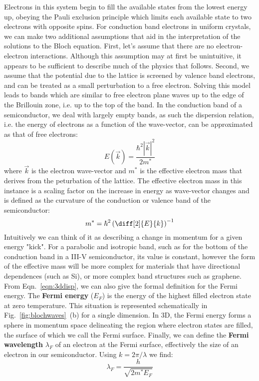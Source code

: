 Electrons in this system begin to fill the available states from the lowest energy up, obeying the Pauli exclusion principle which limits
each available state to two electrons with opposite spins. For conduction band electrons in uniform crystals, we can make
two additional assumptions that aid in the interpretation of the solutions to the Bloch equation. First, let's assume that
there are no electron-electron interactions. Although this assumption may at first be unintuitive, it appears
to be sufficient to describe much of the physics that follows. Second, we assume that the potential due to the
lattice is screened by valence band electrons, and can be treated as a small perturbation to a free electron. Solving
this model leads to bands which are similar to free electron plane waves up to the edge of the Brillouin zone, i.e.
up to the top of the band. In the conduction band of a semiconductor, we deal with largely empty bands, as such
the dispersion relation, i.e. the energy of electrons as a function of the wave-vector, can be approximated as that of free electrons:
\begin{equation}
  E(\vec{k}) = \frac{\hbar^2 |\vec{k}|^2}{2m^*}
  \label{eqn:3ddisp}
\end{equation}
where $\vec{k}$ is the electron wave-vector and $m^*$ is the effective electron mass that derives from the peturbation of the lattice.
The effective electron mass in this instance is a scaling factor on the increase in energy as wave-vector changes and is
defined as the curvature of the conduction or valence band of the semiconductor:
\begin{equation}
  m^* = \hbar^2 \left(\diff[2]{E}{k}\right)^{-1}
\end{equation}
Intuitively we can think of it as describing a change in momentum for a given energy "kick". For a parabolic and isotropic
band, such as for the bottom of the conduction band in a III-V semiconductor, its value is constant, however
the form of the effective mass will be more complex for materials that have directional dependences (such as Si),
or more complex band structures such as graphene. From Eqn.~\ref{eqn:3ddisp}, we can also give the
formal definition for the Fermi energy. The \textbf{Fermi energy} ($E_F$) is the energy of the highest filled electron state
at zero temperature. This situation is represented schematically in Fig.~\ref{fig:blochwaves}~(b) for a single dimension.
In 3D, the Fermi energy forms a sphere in momentum space delineating the region where electron states are filled, the surface
of which we call the Fermi surface. Finally, we can define the \textbf{Fermi wavelength} $\lambda_F$ of an electron at the Fermi
surface, effectively the size of an electron in our semiconductor. Using $k = 2\pi/\lambda$ we find:
\begin{equation}
  \lambda_F = \frac{h}{\sqrt{2m^*E_F}}
\end{equation}

